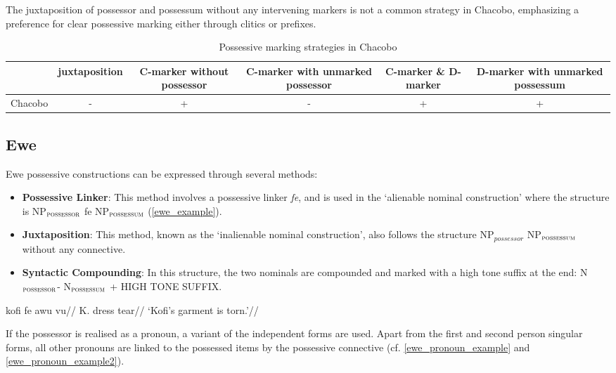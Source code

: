 The juxtaposition of possessor and possessum without any intervening markers is not a common strategy in Chacobo, emphasizing a preference for clear possessive marking either through clitics or prefixes.

\begin{table}[h!]
	\centering
	\small
	\begin{tabular}{@{}cccccc@{}}
		\toprule
		& juxtaposition & \parbox{2.5cm}{C-marker without possessor} & \parbox{2.75cm}{C-marker with unmarked possessor} & \parbox{1.75cm}{C-marker \& D-marker} & \parbox{3cm}{D-marker with unmarked possessum} \\ \midrule
		Chacobo & - & + & - & + & + \\ \bottomrule
	\end{tabular}
	\caption{Possessive marking strategies in Chacobo}
\end{table}

\subsection{Ewe}

Ewe possessive constructions can be expressed through several methods:

\begin{itemize}
	\item \textbf{Possessive Linker}: This method involves a possessive linker \textit{fe}, and is used in the `alienable nominal construction' where the structure is NP$_\textsc{possessor}$ fe NP$_\textsc{possessum}$ (\ref{ewe_example}).
	
	\item \textbf{Juxtaposition}: This method, known as the `inalienable nominal construction', also follows the structure NP$_{possessor}$ NP$_\textsc{possessum}$ without any connective.
	
	\item \textbf{Syntactic Compounding}: In this structure, the two nominals are compounded and marked with a high tone suffix at the end: N$_\textsc{possessor}$- N$_\textsc{possessum}$ + HIGH TONE SUFFIX.
\end{itemize}


\ex
\label{ewe_example}
\begingl
\gla kofi fe awu vu//
\glb K. \Poss{} dress tear//
\glft `Kofi's garment is torn.'//
\endgl
\xe

If the possessor is realised as a pronoun, a variant of the independent forms are used. Apart from the first and second person singular forms, all other pronouns are linked to the possessed items by the possessive connective (cf. \ref{ewe_pronoun_example} and \ref{ewe_pronoun_example2}).

